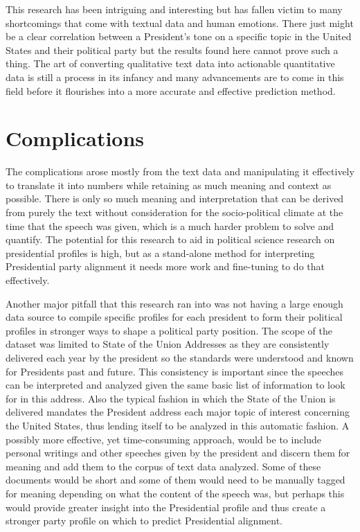 This research has been intriguing and interesting but has fallen victim to many shortcomings that come with textual data and human emotions.
There just might be a clear correlation between a President's tone on a specific topic in the United States and their political party but the results found here cannot prove such a thing.
The art of converting qualitative text data into actionable quantitative data is still a process in its infancy and many advancements are to come in this field before it flourishes into a more accurate and effective prediction method.

\section{Complications}
The complications arose mostly from the text data and manipulating it effectively to translate it into numbers while retaining as much meaning and context as possible.
There is only so much meaning and interpretation that can be derived from purely the text without consideration for the socio-political climate at the time that the speech was given, which is a much harder problem to solve and quantify.
The potential for this research to aid in political science research on presidential profiles is high, but as a stand-alone method for interpreting Presidential party alignment it needs more work and fine-tuning to do that effectively.

Another major pitfall that this research ran into was not having a large enough data source to compile specific profiles for each president to form their political profiles in stronger ways to shape a political party position.
The scope of the dataset was limited to State of the Union Addresses as they are consistently delivered each year by the president so the standards were understood and known for Presidents past and future.
This consistency is important since the speeches can be interpreted and analyzed given the same basic list of information to look for in this address.
Also the typical fashion in which the State of the Union is delivered mandates the President address each major topic of interest concerning the United States, thus lending itself to be analyzed in this automatic fashion.
A possibly more effective, yet time-consuming approach, would be to include personal writings and other speeches given by the president and discern them for meaning and add them to the corpus of text data analyzed.
Some of these documents would be short and some of them would need to be manually tagged for meaning depending on what the content of the speech was, but perhaps this would provide greater insight into the Presidential profile and thus create a stronger party profile on which to predict Presidential alignment.

